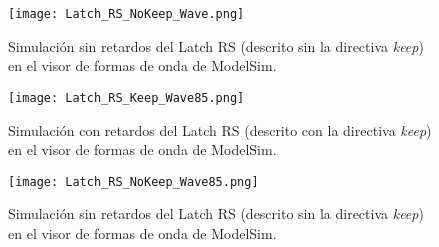 \begin{figure}[ht]
	\centering
	\texttt{[image: Latch\_RS\_NoKeep\_Wave.png]}
	\caption{Simulación sin retardos del Latch RS (descrito sin la directiva \textit{keep}) en el visor de formas de onda de ModelSim. \label{fig:Latch_RS_NoKeep_Wave}}
\end{figure}

\begin{figure}[ht]
	\centering
	\texttt{[image: Latch\_RS\_Keep\_Wave85.png]}
	\caption{Simulación con retardos del Latch RS (descrito con la directiva \textit{keep}) en el visor de formas de onda de ModelSim. \label{fig:Latch_RS_Keep_Wave85}}
\end{figure}

\begin{figure}[ht]
	\centering
	\texttt{[image: Latch\_RS\_NoKeep\_Wave85.png]}
	\caption{Simulación sin retardos del Latch RS (descrito sin la directiva \textit{keep}) en el visor de formas de onda de ModelSim. \label{fig:Latch_RS_NoKeep_Wave85}}
\end{figure}